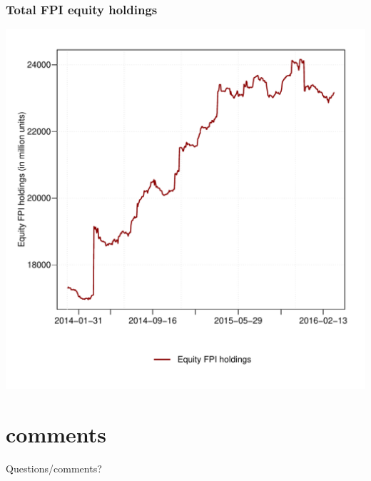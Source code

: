 \documentclass[9pt]{beamer}
\begin{document}



\begin{frame}
 \frametitle{Total FPI equity holdings}
   \centering
   \includegraphics[width=0.8\paperwidth,height=0.5\paperwidth]{../GRAPHS/fpi_sum_equity_all.pdf}
\end{frame}



\section{comments}

\begin{frame}

  \begin{center}
    Questions/comments?
  \end{center}
\end{frame}
 
\end{document}
